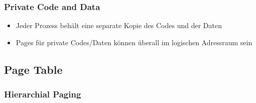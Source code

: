 \documentclass[a4paper]{scrreprt}
\begin{document}
\subsubsection{Private Code and Data}
\begin{itemize}
\item Jeder Prozess behält eine separate Kopie des Codes und der Daten
\item Pages für private Codes/Daten können überall im logischen Adressraum sein
\end{itemize}

\subsection{Page Table}
\subsubsection{Hierarchial Paging}
\end{document}
